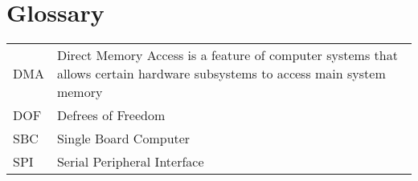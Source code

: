 \section{Glossary}
\begin{table}[H]
    
    \begin{tabular}{p{} p{}}
       DMA  & Direct Memory Access is a feature of computer systems that allows certain hardware subsystems to access main system memory  \\
       DOF & Defrees of Freedom\\
       SBC & Single Board Computer \\
       SPI & Serial Peripheral Interface\\
       
    \end{tabular}
\end{table}

